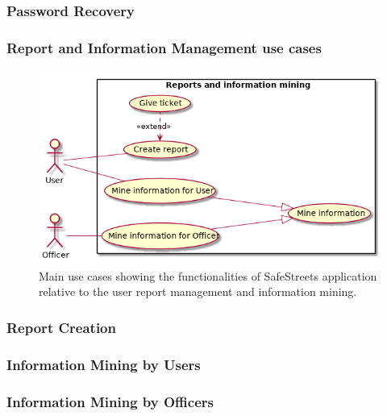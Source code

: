 \subsubsection{Password Recovery}


\subsubsection{Report and Information Management use cases}
\begin{figure}[htp]
	\centering
	\includegraphics[width=\textwidth]{images/useCases/uc_report_and_information_mining.png}
	\caption{Main use cases showing the functionalities of SafeStreets application relative to the user report management and information mining.} 
	\label{fig:reportmanagement} 
\end{figure}

\newpage
\subsubsection{Report Creation}

\newpage
{}
\subsubsection{Information Mining by Users}

\newpage
{}
\subsubsection{Information Mining by Officers}

\newpage
{}

